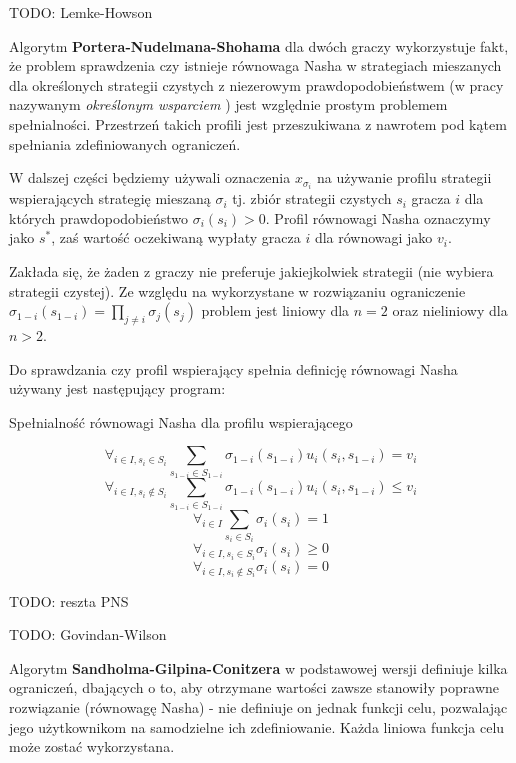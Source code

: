 \documentclass[polish]{standalone}
\begin{document}
TODO: Lemke-Howson

Algorytm \textbf{Portera-Nudelmana-Shohama} dla dwóch graczy wykorzystuje fakt, że problem sprawdzenia czy istnieje
równowaga Nasha w strategiach mieszanych dla określonych strategii czystych z niezerowym prawdopodobieństwem (w pracy
nazywanym \textit{określonym wsparciem} ) jest względnie prostym problemem
spełnialności. Przestrzeń takich profili jest przeszukiwana z nawrotem pod kątem spełniania zdefiniowanych ograniczeń.

W dalszej części będziemy używali oznaczenia $x_{\sigma_i}$ na używanie profilu strategii wspierających strategię
mieszaną $\sigma_i$ tj. zbiór strategii czystych $s_i$ gracza $i$ dla których prawdopodobieństwo $\sigma_i(s_i) > 0$.
Profil równowagi Nasha oznaczymy jako $s^{*}$, zaś wartość oczekiwaną wypłaty gracza $i$ dla równowagi jako $v_i$.

Zakłada się, że żaden z graczy nie preferuje jakiejkolwiek strategii (nie wybiera strategii czystej). Ze względu na
wykorzystane w rozwiązaniu ograniczenie $\sigma_{1-i}(s_{1-i}) = \prod_{j \ne i} \sigma_j(s_j)$ problem jest liniowy
dla $n = 2$ oraz nieliniowy dla $n > 2$.

Do sprawdzania czy profil wspierający spełnia definicję równowagi Nasha używany jest następujący program:
\begin{algorithm}
\caption{Spełnialność równowagi Nasha dla profilu wspierającego}
\label{FEAS1}
\begin{algorithmic}
$$\forall_{i \in I, s_i \in S_i} \sum_{s_{1-i} \in S_{1-i}} \sigma_{1-i}(s_{1-i}) u_i(s_i, s_{1-i}) = v_i$$
$$\forall_{i \in I, s_i \not\in S_i} \sum_{s_{1-i} \in S_{1-i}} \sigma_{1-i}(s_{1-i}) u_i(s_i, s_{1-i}) \leq v_i$$
$$\forall_{i \in I} \sum_{s_i \in S_i} \sigma_i(s_i) = 1$$
$$\forall_{i \in I, s_i \in S_i} \sigma_i(s_i) \geq 0$$
$$\forall_{i \in I, s_i \not\in S_i} \sigma_i(s_i) = 0$$
\end{algorithmic}
\end{algorithm}

TODO: reszta PNS

TODO: Govindan-Wilson

Algorytm \textbf{Sandholma-Gilpina-Conitzera} w podstawowej wersji definiuje kilka ograniczeń, dbających o to, aby 
otrzymane wartości zawsze stanowiły poprawne rozwiązanie (równowagę Nasha) - nie definiuje on jednak funkcji celu,
pozwalając jego użytkownikom na samodzielne ich zdefiniowanie. Każda liniowa funkcja celu może zostać wykorzystana.
\end{document}
